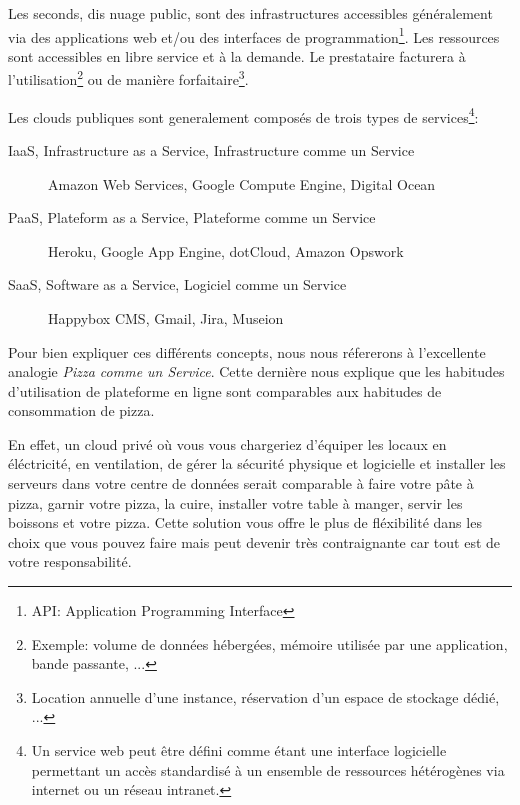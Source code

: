 \documentclass[11pt, a4paper ]{article}
\begin{document}
\begin{spacing}{1.5}
Les seconds, dis nuage public, sont des infrastructures accessibles généralement via des applications web et/ou des interfaces de programmation\footnote{API: Application Programming Interface}. Les ressources sont accessibles en libre service et à la demande. Le prestataire facturera à l'utilisation\footnote{Exemple: volume de données hébergées, mémoire utilisée par une application, bande passante, ...} ou de manière forfaitaire\footnote{Location annuelle d'une instance, réservation d'un espace de stockage dédié, ...}.

Les clouds publiques sont generalement composés de trois types de services\footnote{Un service web\cite{webServicesDef} peut être défini comme étant une interface logicielle permettant un accès standardisé à un ensemble de ressources hétérogènes via internet ou un réseau intranet.}:
\begin{description}

	\item[IaaS, Infrastructure as a Service, Infrastructure comme un Service] Amazon Web Services, Google Compute Engine, Digital Ocean

	\item[PaaS, Plateform as a Service, Plateforme comme un Service] Heroku, Google App Engine, dotCloud, Amazon Opswork

	\item[SaaS, Software as a Service, Logiciel comme un Service]
	Happybox CMS, Gmail, Jira, Museion

\end{description}

Pour bien expliquer ces différents concepts, nous nous réfererons à l'excellente analogie \emph{Pizza comme un Service}\cite{PizzaasaService}. Cette dernière nous explique que les habitudes d'utilisation de plateforme en ligne sont comparables aux habitudes de consommation de pizza.

En effet, un cloud privé où vous vous chargeriez d'équiper les locaux en éléctricité, en ventilation, de gérer la sécurité physique et logicielle et installer les serveurs dans votre centre de données serait comparable à faire votre pâte à pizza, garnir votre pizza, la cuire, installer votre table à manger, servir les boissons et votre pizza. Cette solution vous offre le plus de fléxibilité dans les choix que vous pouvez faire mais peut devenir très contraignante car tout est de votre responsabilité.


\end{spacing}
\end{document}
